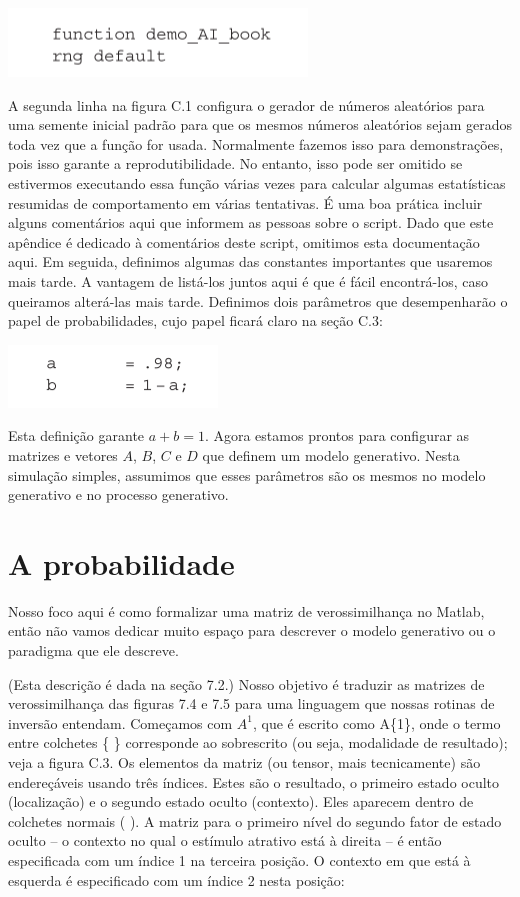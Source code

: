 \documentclass[
  12pt,
]{book}
\begin{document}
\includegraphics{images/Figura_C1.png}

A segunda linha na figura C.1 configura o gerador de números aleatórios para uma semente inicial padrão para que os mesmos números aleatórios sejam gerados toda vez que a função for usada. Normalmente fazemos isso para demonstrações, pois isso garante a reprodutibilidade. No entanto, isso pode ser omitido se estivermos executando essa função várias vezes para calcular algumas estatísticas resumidas de comportamento em várias tentativas. É uma boa prática incluir alguns comentários aqui que informem as pessoas sobre o script. Dado que este apêndice é dedicado à comentários deste script, omitimos esta documentação aqui. Em seguida, definimos algumas das constantes importantes que usaremos mais tarde. A vantagem de listá-los juntos aqui é que é fácil encontrá-los, caso queiramos alterá-las mais tarde. Definimos dois parâmetros que desempenharão o papel de probabilidades, cujo papel ficará claro na seção C.3:

\includegraphics{images/Figura_C2.png}

Esta definição garante \(a + b  =  1\). Agora estamos prontos para configurar as matrizes e vetores \(A\), \(B\), \(C\) e \(D\) que definem um modelo generativo. Nesta simulação simples, assumimos que esses parâmetros são os mesmos no modelo generativo e no processo generativo.

\hypertarget{a-probabilidade}{%
\section{A probabilidade}\label{a-probabilidade}}

Nosso foco aqui é como formalizar uma matriz de verossimilhança no Matlab, então não vamos dedicar muito espaço para descrever o modelo generativo ou o paradigma que ele descreve.

(Esta descrição é dada na seção 7.2.) Nosso objetivo é traduzir as matrizes de verossimilhança das figuras 7.4 e 7.5 para uma linguagem que nossas rotinas de inversão entendam. Começamos com \(A^1\), que é escrito como A\{1\}, onde o termo entre colchetes \{ \} corresponde ao sobrescrito (ou seja, modalidade de resultado); veja a figura C.3. Os elementos da matriz (ou tensor, mais tecnicamente) são endereçáveis usando três índices. Estes são o resultado, o primeiro estado oculto (localização) e o segundo estado oculto (contexto). Eles aparecem dentro de colchetes normais ( ). A matriz para o primeiro nível do segundo fator de estado oculto -- o contexto no qual o estímulo atrativo está à direita -- é então especificada com um índice 1 na terceira posição. O contexto em que está à esquerda é especificado com um índice 2 nesta posição:
\end{document}
